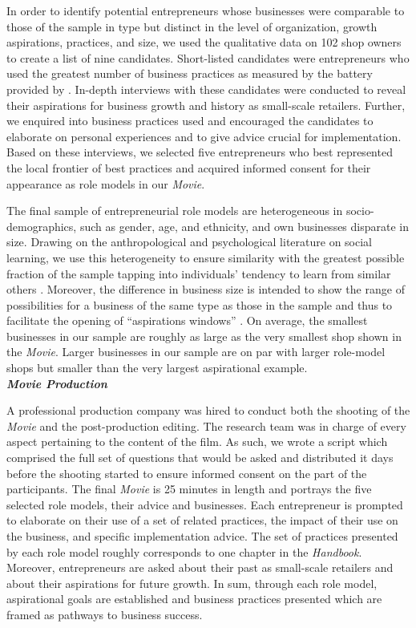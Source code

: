 \documentclass[11.5pt]{article}
\begin{document}
\noindent In order to identify potential entrepreneurs whose businesses were comparable to those of the sample in type but distinct in the level of organization, growth aspirations, practices, and size, we used the qualitative data on 102 shop owners to create a list of nine candidates. Short-listed candidates were entrepreneurs who used the greatest number of business practices as measured by the battery provided by \citet{McKenzie2017}. In-depth interviews with these candidates were conducted to reveal their aspirations for business growth and history as small-scale retailers. Further, we enquired into business practices used and encouraged the candidates to elaborate on personal experiences and to give advice crucial for implementation. Based on these interviews, we selected five entrepreneurs who best represented the local frontier of best practices and acquired informed consent for their appearance as role models in our \emph{Movie}.

The final sample of entrepreneurial role models are heterogeneous in socio-demographics, such as gender, age, and ethnicity, and own businesses disparate in size. Drawing on the anthropological and psychological literature on social learning, we use this heterogeneity to ensure similarity with the greatest possible fraction of the sample tapping into individuals' tendency to learn from similar others \citep{Chudek2013, Corriveau2009, Efferson2008, McElreath2008, Morgan2011, Rendell2011}. Moreover, the difference in business size is intended to show the range of possibilities for a business of the same type as those in the sample and thus to facilitate the opening of ``aspirations windows'' \citep{Ray2006}. On average, the smallest businesses in our sample are roughly as large as the very smallest shop shown in the \emph{Movie}. Larger businesses in our sample are on par with larger role-model shops but smaller than the very largest aspirational example.\\

\noindent \emph{\textbf{Movie Production}}\

\noindent A professional production company was hired to conduct both the shooting of the \emph{Movie} and the post-production editing. The research team was in charge of every aspect pertaining to the content of the film. As such, we wrote a script which comprised the full set of questions that would be asked and distributed it days before the shooting started to ensure informed consent on the part of the participants. The final \emph{Movie} is 25 minutes in length and portrays the five selected role models, their advice and businesses. Each entrepreneur is prompted to elaborate on their use of a set of related practices, the impact of their use on the business, and specific implementation advice. The set of practices presented by each role model roughly corresponds to one chapter in the \emph{Handbook}. Moreover, entrepreneurs are asked about their past as small-scale retailers and about their aspirations for future growth. In sum, through each role model, aspirational goals are established and business practices presented which are framed as pathways to business success. \\
\end{document}
